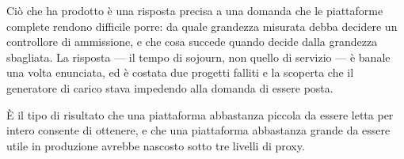 Ci\`o che ha prodotto \`e una risposta precisa a una domanda che le piattaforme
complete rendono difficile porre: da quale grandezza misurata debba decidere un
controllore di ammissione, e che cosa succede quando decide dalla grandezza
sbagliata. La risposta --- il tempo di sojourn, non quello di servizio --- \`e
banale una volta enunciata, ed \`e costata due progetti falliti e la scoperta che
il generatore di carico stava impedendo alla domanda di essere posta.

\`E il tipo di risultato che una piattaforma abbastanza piccola da essere letta
per intero consente di ottenere, e che una piattaforma abbastanza grande da
essere utile in produzione avrebbe nascosto sotto tre livelli di proxy.
